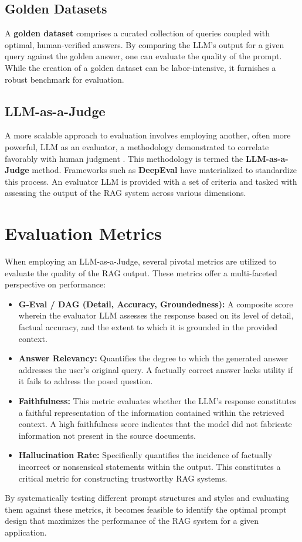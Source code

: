 \subsection{Golden Datasets}
A \textbf{golden dataset} comprises a curated collection of queries coupled with optimal, human-verified answers. By comparing the LLM's output for a given query against the golden answer, one can evaluate the quality of the prompt. While the creation of a golden dataset can be labor-intensive, it furnishes a robust benchmark for evaluation.

\subsection{LLM-as-a-Judge}
A more scalable approach to evaluation involves employing another, often more powerful, LLM as an evaluator, a methodology demonstrated to correlate favorably with human judgment \autocite{zheng2023judging}. This methodology is termed the \textbf{LLM-as-a-Judge} method. Frameworks such as \textbf{DeepEval} have materialized to standardize this process. An evaluator LLM is provided with a set of criteria and tasked with assessing the output of the RAG system across various dimensions.

\section{Evaluation Metrics}
When employing an LLM-as-a-Judge, several pivotal metrics are utilized to evaluate the quality of the RAG output. These metrics offer a multi-faceted perspective on performance:
\begin{itemize}
    \item \textbf{G-Eval / DAG (Detail, Accuracy, Groundedness):} A composite score wherein the evaluator LLM assesses the response based on its level of detail, factual accuracy, and the extent to which it is grounded in the provided context.
    \item \textbf{Answer Relevancy:} Quantifies the degree to which the generated answer addresses the user's original query. A factually correct answer lacks utility if it fails to address the posed question.
    \item \textbf{Faithfulness:} This metric evaluates whether the LLM's response constitutes a faithful representation of the information contained within the retrieved context. A high faithfulness score indicates that the model did not fabricate information not present in the source documents.
    \item \textbf{Hallucination Rate:} Specifically quantifies the incidence of factually incorrect or nonsensical statements within the output. This constitutes a critical metric for constructing trustworthy RAG systems.
\end{itemize}

By systematically testing different prompt structures and styles and evaluating them against these metrics, it becomes feasible to identify the optimal prompt design that maximizes the performance of the RAG system for a given application.